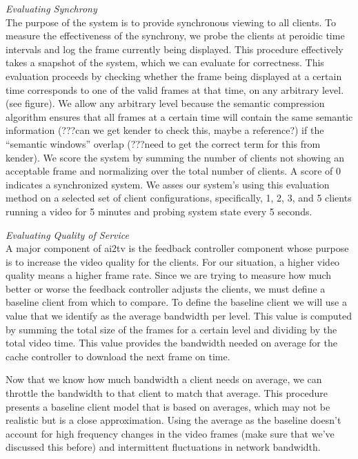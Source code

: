 \documentclass{sig-alternate}
\begin{document}
\textit{Evaluating Synchrony} \\ The purpose of the system is to
provide synchronous viewing to all clients.  To measure the
effectiveness of the synchrony, we probe the clients at peroidic time
intervals and log the frame currently being displayed.  This procedure
effectively takes a snapshot of the system, which we can evaluate for
correctness.  This evaluation proceeds by checking whether the frame
being displayed at a certain time corresponds to one of the valid
frames at that time, on any arbitrary level.  (see figure).  We allow
any arbitrary level because the semantic compression algorithm ensures
that all frames at a certain time will contain the same semantic
information (???can we get kender to check this, maybe a reference?)
if the ``semantic windows'' overlap (???need to get the correct term
for this from kender).  We score the system by summing the number of
clients not showing an acceptable frame and normalizing over the total
number of clients.  A score of 0 indicates a synchronized system.  We
asses our system's using this evaluation method on a selected set of
client configurations, specifically, 1, 2, 3, and 5 clients running a
video for 5 minutes and probing system state every 5 seconds.

\textit{Evaluating Quality of Service} \\
A major component of ai2tv is the feedback controller component whose
purpose is to increase the video quality for the clients.  For our
situation, a higher video quality means a higher frame rate.  Since we
are trying to measure how much better or worse the feedback controller
adjusts the clients, we must define a baseline client from which to
compare.  To define the baseline client we will use a value that we
identify as the average bandwidth per level.  This value is computed
by summing the total size of the frames for a certain level and
dividing by the total video time.  This value provides the bandwidth
needed on average for the cache controller to download the next frame
on time.

Now that we know how much bandwidth a client needs on average, we can
throttle the bandwidth to that client to match that average.  This
procedure presents a baseline client model that is based on averages,
which may not be realistic but is a close approximation.  Using the
average as the baseline doesn't account for high frequency changes in
the video frames (make sure that we've discussed this before) and
intermittent fluctuations in network bandwidth.
\end{document}
